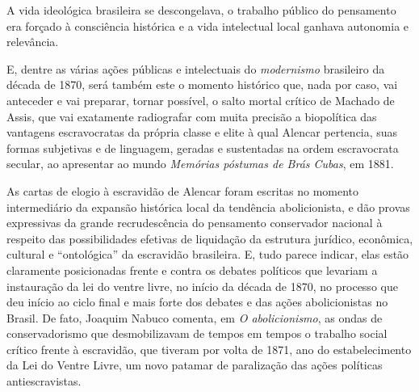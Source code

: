 A vida ideológica brasileira se descongelava, o trabalho público do
pensamento era forçado à consciência histórica e a vida intelectual
local ganhava autonomia e relevância.

E, dentre as várias ações públicas e intelectuais do \emph{modernismo}
brasileiro da década de 1870, será também este o momento histórico que,
nada por caso, vai anteceder e vai preparar, tornar possível, o salto
mortal crítico de Machado de Assis, que vai exatamente radiografar com
muita precisão a biopolítica das vantagens escravocratas da própria
classe e elite à qual Alencar pertencia, suas formas subjetivas e de
linguagem, geradas e sustentadas na ordem escravocrata secular, ao
apresentar ao mundo \emph{Memórias póstumas de Brás Cubas}, em 1881.

As cartas de elogio à escravidão de Alencar foram escritas no momento
intermediário da expansão histórica local da tendência abolicionista, e
dão provas expressivas da grande recrudescência do pensamento
conservador nacional à respeito das possibilidades efetivas de
liquidação da estrutura jurídico, econômica, cultural e ``ontológica''
da escravidão brasileira. E, tudo parece indicar, elas estão claramente
posicionadas frente e contra os debates políticos que levariam a
instauração da lei do ventre livre, no início da década de 1870, no
processo que deu início ao ciclo final e mais forte dos debates e das
ações abolicionistas no Brasil. De fato, Joaquim Nabuco comenta, em
\emph{O abolicionismo}, as ondas de conservadorismo que desmobilizavam
de tempos em tempos o trabalho social crítico frente à escravidão, que
tiveram por volta de 1871, ano do estabelecimento da Lei do Ventre
Livre, um novo patamar de paralização das ações políticas
antiescravistas.

